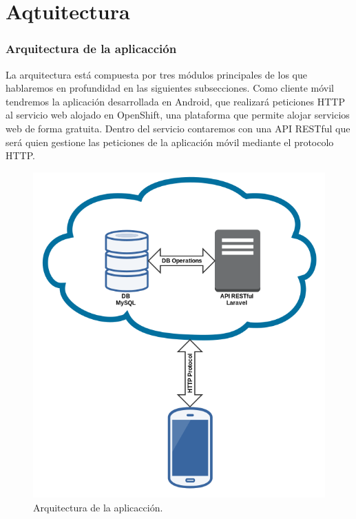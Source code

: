 \newpage
\thispagestyle{sectioned}
\chapter{Aqtuitectura}

\subsection{Arquitectura de la aplicacción}

La arquitectura está compuesta por tres módulos principales de los que hablaremos en profundidad en las siguientes subsecciones. Como cliente móvil tendremos la aplicación desarrollada en Android, que realizará peticiones HTTP al servicio web alojado en OpenShift, una plataforma que permite alojar servicios web de forma gratuita. Dentro del servicio contaremos con una API RESTful que será quien gestione las peticiones de la aplicación móvil mediante el protocolo HTTP.

\begin{figure}[H]
\centering
\includegraphics[keepaspectratio, scale=0.4]{Media/Captures/architecture.png}
\caption{Arquitectura de la aplicacción.}
\label{fig:architecture}
\end{figure}


